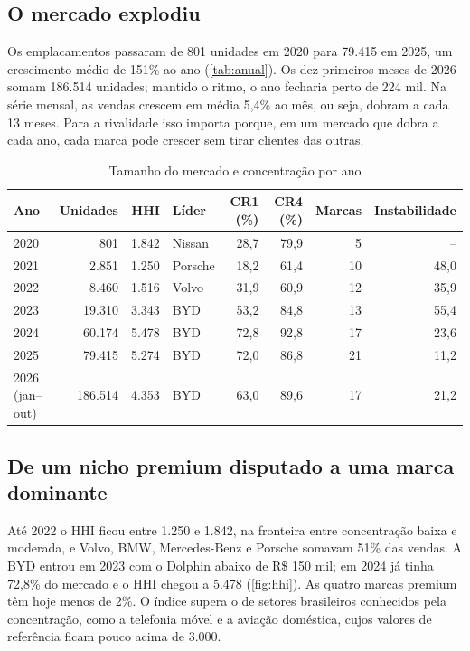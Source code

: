 \documentclass[article,11pt,oneside,a4paper,english,brazil,sumario=tradicional]{abntex2}
\begin{document}
\subsection{O mercado explodiu}

Os emplacamentos passaram de 801 unidades em 2020 para 79.415 em 2025, um crescimento médio de 151\% ao ano (\autoref{tab:anual}). Os dez primeiros meses de 2026 somam 186.514 unidades; mantido o ritmo, o ano fecharia perto de 224 mil. Na série mensal, as vendas crescem em média 5,4\% ao mês, ou seja, dobram a cada 13 meses. Para a rivalidade isso importa porque, em um mercado que dobra a cada ano, cada marca pode crescer sem tirar clientes das outras.

\begin{table}[htb]
\caption{Tamanho do mercado e concentração por ano}\label{tab:anual}
\centering
\small
\begin{tabular}{lrrlrrrr}
\toprule
Ano & Unidades & HHI & Líder & CR1 (\%) & CR4 (\%) & Marcas & Instabilidade \\
\midrule
2020 & 801 & 1.842 & Nissan & 28,7 & 79,9 & 5 & -- \\
2021 & 2.851 & 1.250 & Porsche & 18,2 & 61,4 & 10 & 48,0 \\
2022 & 8.460 & 1.516 & Volvo & 31,9 & 60,9 & 12 & 35,9 \\
2023 & 19.310 & 3.343 & BYD & 53,2 & 84,8 & 13 & 55,4 \\
2024 & 60.174 & 5.478 & BYD & 72,8 & 92,8 & 17 & 23,6 \\
2025 & 79.415 & 5.274 & BYD & 72,0 & 86,8 & 21 & 11,2 \\
2026 (jan--out) & 186.514 & 4.353 & BYD & 63,0 & 89,6 & 17 & 21,2 \\
\bottomrule
\end{tabular}
\end{table}

\subsection{De um nicho premium disputado a uma marca dominante}

Até 2022 o HHI ficou entre 1.250 e 1.842, na fronteira entre concentração baixa e moderada, e Volvo, BMW, Mercedes-Benz e Porsche somavam 51\% das vendas. A BYD entrou em 2023 com o Dolphin abaixo de R\$ 150 mil; em 2024 já tinha 72,8\% do mercado e o HHI chegou a 5.478 (\autoref{fig:hhi}). As quatro marcas premium têm hoje menos de 2\%. O índice supera o de setores brasileiros conhecidos pela concentração, como a telefonia móvel e a aviação doméstica, cujos valores de referência ficam pouco acima de 3.000.
\end{document}
